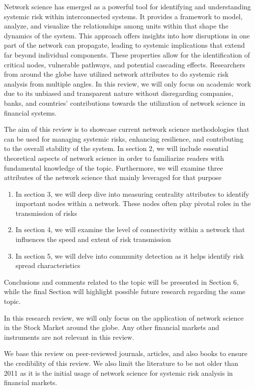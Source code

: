 \documentclass[a4paper,11pt]{article}
\begin{document}
Network science has emerged as a powerful tool for identifying and understanding systemic risk within interconnected systems. It provides a framework to model, analyze, and visualize the relationships among units within that shape the dynamics of the system. This approach offers insights into how disruptions in one part of the network can propagate, leading to systemic implications that extend far beyond individual components. These properties allow for the identification of critical nodes, vulnerable pathways, and potential cascading effects. Researchers from around the globe have utilized network attributes to do systemic risk analysis from multiple angles. In this review, we will only focus on academic work due to its unbiased and transparent nature without disregarding companies, banks, and countries' contributions towards the utilization of network science in financial systems.

The aim of this review is to showcase current network science methodologies that can be used for managing systemic risks, enhancing resilience, and contributing to the overall stability of the system. In section 2, we will include essential theoretical aspects of network science in order to familiarize readers with fundamental knowledge of the topic. Furthermore, we will examine three attributes of the network science that mainly leveraged for that purpose

\begin{enumerate}
        \item In section 3, we will deep dive into measuring centrality attributes to identify important nodes within a network. These nodes often play pivotal roles in the transmission of risks
        \item In section 4, we will examine the level of connectivity within a network that influences the speed and extent of risk transmission
        \item In section 5, we will delve into community detection as it helps identify risk spread characteristics
\end{enumerate}
Conclusions and comments related to the topic will be presented in Section 6, while the final Section will highlight possible future research regarding the same topic.

In this research review, we will only focus on the application of network science in the Stock Market around the globe. Any other financial markets and instruments are not relevant in this review.

We base this review on peer-reviewed journals, articles, and also books to ensure the credibility of this review. We also limit the literature to be not older than 2011 as it is the initial usage of network science for systemic risk analysis in financial markets.
\end{document}
